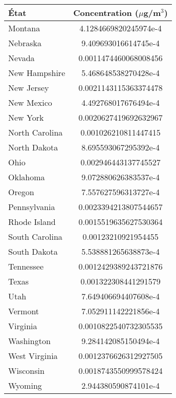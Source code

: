 \begin{tabular}{lS[table-format=1.4, scientific-notation = fixed, fixed-exponent = 0, round-mode = figures, round-precision = 4]}
	\toprule
	État & {Concentration ($\mu$g/m$^3$)} \\
	\midrule
	Montana & 4.1284669820245974e-4 \\
	Nebraska & 9.409693016614745e-4 \\
	Nevada & 0.0011474460068008456 \\
	New Hampshire & 5.468648538270428e-4 \\
	New Jersey & 0.0021143115363374478 \\
	New Mexico & 4.492768017676494e-4 \\
	New York & 0.0020627419692632967 \\
	North Carolina & 0.001026210811447415 \\
	North Dakota & 8.695593067295392e-4 \\
	Ohio & 0.002946443137745527 \\
	Oklahoma & 9.072880626383537e-4 \\
	Oregon & 7.557627596313727e-4 \\
	Pennsylvania & 0.0023394213807544657 \\
	Rhode Island & 0.0015519635627530364 \\
	South Carolina & 0.00123210921954455 \\
	South Dakota & 5.538881265638873e-4 \\
	Tennessee & 0.0012429389243721876 \\
	Texas & 0.001322308441291579 \\
	Utah & 7.649406694407608e-4 \\
	Vermont & 7.052911142221856e-4 \\
	Virginia & 0.0010822540732305535 \\
	Washington & 9.284142085150494e-4 \\
	West Virginia & 0.0012376626312927505 \\
	Wisconsin & 0.0018743550999578424 \\
	Wyoming & 2.944380590874101e-4 \\
	\bottomrule
\end{tabular}